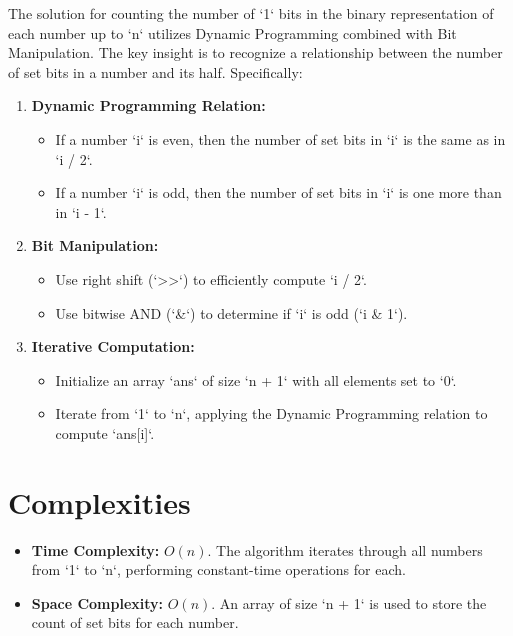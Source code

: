 The solution for counting the number of `1` bits in the binary representation of each number up to `n` utilizes Dynamic Programming combined with Bit Manipulation. The key insight is to recognize a relationship between the number of set bits in a number and its half. Specifically:

\begin{enumerate}
    \item \textbf{Dynamic Programming Relation:}
    \begin{itemize}
        \item If a number `i` is even, then the number of set bits in `i` is the same as in `i / 2`.
        \item If a number `i` is odd, then the number of set bits in `i` is one more than in `i - 1`.
    \end{itemize}
    
    \item \textbf{Bit Manipulation:}
    \begin{itemize}
        \item Use right shift (`>>`) to efficiently compute `i / 2`.
        \item Use bitwise AND (`\&`) to determine if `i` is odd (`i \& 1`).
    \end{itemize}
    
    \item \textbf{Iterative Computation:}
    \begin{itemize}
        \item Initialize an array `ans` of size `n + 1` with all elements set to `0`.
        \item Iterate from `1` to `n`, applying the Dynamic Programming relation to compute `ans[i]`.
    \end{itemize}
\end{enumerate}


\section*{Complexities}

\begin{itemize}
    \item \textbf{Time Complexity:} \(O(n)\). The algorithm iterates through all numbers from `1` to `n`, performing constant-time operations for each.
    
    \item \textbf{Space Complexity:} \(O(n)\). An array of size `n + 1` is used to store the count of set bits for each number.
\end{itemize}

